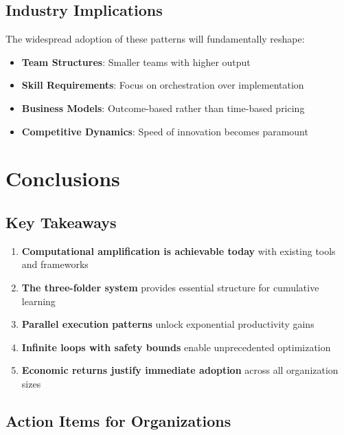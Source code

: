 \documentclass[11pt]{article}
\begin{document}
\subsection{Industry Implications}

The widespread adoption of these patterns will fundamentally reshape:
\begin{itemize}[noitemsep]
\item \textbf{Team Structures}: Smaller teams with higher output
\item \textbf{Skill Requirements}: Focus on orchestration over implementation
\item \textbf{Business Models}: Outcome-based rather than time-based pricing
\item \textbf{Competitive Dynamics}: Speed of innovation becomes paramount
\end{itemize}

\section{Conclusions}

\subsection{Key Takeaways}

\begin{enumerate}
\item \textbf{Computational amplification is achievable today} with existing tools and frameworks
\item \textbf{The three-folder system} provides essential structure for cumulative learning
\item \textbf{Parallel execution patterns} unlock exponential productivity gains
\item \textbf{Infinite loops with safety bounds} enable unprecedented optimization
\item \textbf{Economic returns justify immediate adoption} across all organization sizes
\end{enumerate}

\subsection{Action Items for Organizations}
\end{document}
